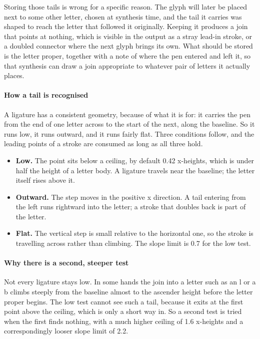Storing those tails is wrong for a specific reason. The glyph will later be placed next to some other letter, chosen at synthesis time, and the tail it carries was shaped to reach the letter that followed it originally. Keeping it produces a join that points at nothing, which is visible in the output as a stray lead-in stroke, or a doubled connector where the next glyph brings its own. What should be stored is the letter proper, together with a note of where the pen entered and left it, so that synthesis can draw a join appropriate to whatever pair of letters it actually places.


\paragraph{How a tail is recognised}
A ligature has a consistent geometry, because of what it is for: it carries the pen from the end of one letter across to the start of the next, along the baseline. So it runs low, it runs outward, and it runs fairly flat. Three conditions follow, and the leading points of a stroke are consumed as long as all three hold.


\begin{itemize}\setlength\itemsep{0pt}
  \item \textbf{Low.} The point sits below a ceiling, by default 0.42 x-heights, which is under half the height of a letter body. A ligature travels near the baseline; the letter itself rises above it.
  \item \textbf{Outward.} The step moves in the positive x direction. A tail entering from the left runs rightward into the letter; a stroke that doubles back is part of the letter.
  \item \textbf{Flat.} The vertical step is small relative to the horizontal one, so the stroke is travelling across rather than climbing. The slope limit is 0.7 for the low test.
\end{itemize}

\paragraph{Why there is a second, steeper test}
Not every ligature stays low. In some hands the join into a letter such as an l or a b climbs steeply from the baseline almost to the ascender height before the letter proper begins. The low test cannot see such a tail, because it exits at the first point above the ceiling, which is only a short way in. So a second test is tried when the first finds nothing, with a much higher ceiling of 1.6 x-heights and a correspondingly looser slope limit of 2.2.


